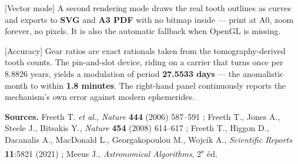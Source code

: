 \documentclass[a4paper,11pt]{article}
\begin{document}
\begin{english}[Vector mode]
A second rendering mode draws the real tooth outlines as curves and exports to
\textbf{SVG} and \textbf{A3 PDF} with no bitmap inside — print at A0, zoom
forever, no pixels. It is also the automatic fallback when OpenGL is missing.
\end{english}

\begin{english}[Accuracy]
Gear ratios are exact rationals taken from the tomography-derived tooth counts.
The pin-and-slot device, riding on a carrier that turns once per 8.8826 years,
yields a modulation of period \textbf{27.5533 days} — the anomalistic month to
within \textbf{1.8 minutes}. The right-hand panel continuously reports the
mechanism's own error against modern ephemerides.
\end{english}

\vfill
\begin{center}
\begin{tcolorbox}[colback=lightgray, colframe=darkgray, width=0.95\textwidth,
  arc=2mm]
\small
\textbf{Sources.} Freeth T. \textit{et al.}, \textit{Nature} \textbf{444}
(2006) 587–591 ; Freeth T., Jones A., Steele J., Bitsakis Y.,
\textit{Nature} \textbf{454} (2008) 614–617 ; Freeth T., Higgon D.,
Dacanalis A., MacDonald L., Georgakopoulou M., Wojcik A.,
\textit{Scientific Reports} \textbf{11}:5821 (2021) ; Meeus J.,
\textit{Astronomical Algorithms}, 2\textsuperscript{e} éd.
\end{tcolorbox}
\end{center}
\end{document}

